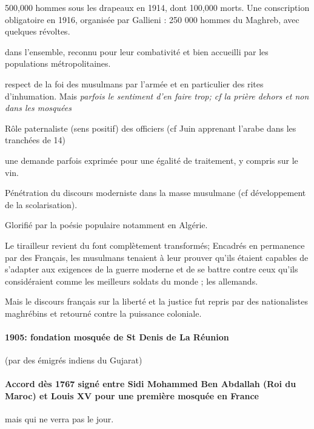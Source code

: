 
500,000 hommes sous les drapeaux en 1914, dont 100,000 morts. Une conscription obligatoire en 1916, organisée par Gallieni : 250 000 hommes du Maghreb, avec quelques révoltes.
 
\bi
\item dans l'ensemble, reconnu pour leur combativité et bien accueilli par les populations métropolitaines. 
\item respect de la foi des musulmans par l'armée et en particulier des rites d'inhumation. Mais \textit{parfois le sentiment d'en faire trop; cf la prière dehors et non dans les mosquées}
\item Rôle paternaliste (sens positif) des officiers (cf Juin apprenant l'arabe dans les tranchées de 14)
\item une demande parfois exprimée pour une égalité de traitement, y compris sur le vin.
\item Pénétration du discours moderniste dans la masse musulmane (cf développement de la scolarisation). 
\item Glorifié par la poésie populaire notamment en Algérie. 
\ei



\begin{Synthesis}
Le tirailleur revient du font complètement transformés; Encadrés en permanence par des Français, les musulmans tenaient à leur prouver qu'ils étaient capables de s'adapter aux exigences de la guerre moderne et de se battre contre ceux qu'ils considéraient comme les meilleurs soldats du monde  ; les allemands. 
\end{Synthesis}
Mais le discours français sur la liberté et la justice fut repris par des nationalistes maghrébins et retourné contre la puissance coloniale. 


\paragraph{1905: fondation mosquée de St Denis de La Réunion}
(par des émigrés indiens du Gujarat)

\paragraph{Accord dès 1767 signé entre Sidi Mohammed Ben Abdallah (Roi du Maroc) et Louis XV pour une première mosquée en France}
 mais qui ne verra pas le jour.


